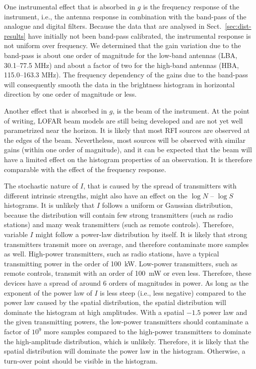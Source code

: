 \documentclass[useAMS,usenatbib]{mn2e}
\begin{document}
One instrumental effect that is absorbed in $g$ is the frequency response of the instrument, i.e., the antenna response in combination with the band-pass of the analogue and digital filters. Because the data that are analysed in Sect.~\ref{sec:dist-results} have initially not been band-pass calibrated, the instrumental response is not uniform over frequency. We determined that the gain variation due to the band-pass is about one order of magnitude for the low-band antennas (LBA, 30.1--77.5 MHz) and about a factor of two for the high-band antennas (HBA, 115.0--163.3 MHz). The frequency dependency of the gains due to the band-pass will consequently smooth the data in the brightness histogram in horizontal direction by one order of magnitude or less.

Another effect that is absorbed in $g$, is the beam of the instrument. At the point of writing, LOFAR beam models are still being developed and are not yet well parametrized near the horizon. It is likely that most RFI sources are observed at the edges of the beam. Nevertheless, most sources will be observed with similar gains (within one order of magnitude), and it can be expected that the beam will have a limited effect on the histogram properties of an observation. It is therefore comparable with the effect of the frequency response.

The stochastic nature of $I$, that is caused by the spread of transmitters with different intrinsic strengths, might also have an effect on the $\log N$ -- $\log S$ histograms. It is unlikely that $I$ follows a uniform or Gaussian distribution, because the distribution will contain few strong transmitters (such as radio stations) and many weak transmitters (such as remote controls). Therefore, variable $I$ might follow a power-law distribution by itself. It is likely that strong transmitters transmit more on average, and therefore contaminate more samples as well. High-power transmitters, such as radio stations, have a typical transmitting power in the order of 100~kW. Low-power transmitters, such as remote controls, transmit with an order of 100~mW or even less. Therefore, these devices have a spread of around 6 orders of magnitudes in power. As long as the exponent of the power law of $I$ is less steep (i.e., less negative) compared to the power law caused by the spatial distribution, the spatial distribution will dominate the histogram at high amplitudes. With a spatial $-1.5$ power law and the given transmitting powers, the low-power transmitters should contaminate a factor of $10^9$ more samples compared to the high-power transmitters to dominate the high-amplitude distribution, which is unlikely. Therefore, it is likely that the spatial distribution will dominate the power law in the histogram. Otherwise, a turn-over point should be visible in the histogram.
\end{document}
